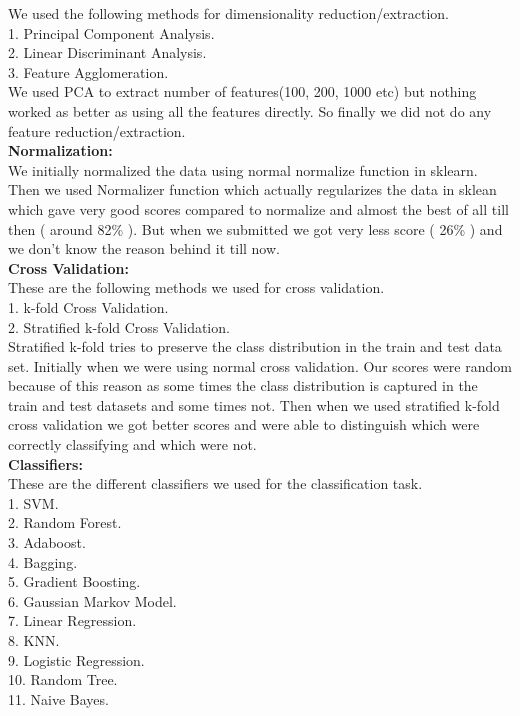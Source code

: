 \documentclass{article}
\begin{document}
We used the following methods for dimensionality reduction/extraction.\\
1. Principal Component Analysis.\\
2. Linear Discriminant Analysis.\\
3. Feature Agglomeration.\\

We used PCA to extract number of features(100, 200, 1000 etc) but nothing worked as better as using all the features directly. So finally we did not do any feature reduction/extraction.\\

{\bf Normalization:}\\

We initially normalized the data using normal normalize function in sklearn. Then we used Normalizer function which actually regularizes the data in sklean which gave very good scores compared to normalize and almost the best of all till then ( around 82\% ). But when we submitted we got very less score ( 26\% ) and we don't know the reason behind it till now.\\

{\bf Cross Validation:}\\
These are the following methods we used for cross validation.\\

1. k-fold Cross Validation.\\
2. Stratified k-fold Cross Validation.\\

Stratified k-fold tries to preserve the class distribution in the train and test data set. Initially when we were using normal cross validation. Our scores were random because of this reason as some times the class distribution is captured in the train and test datasets and some times not. Then when we used stratified k-fold cross validation we got better scores and were able to distinguish which were correctly classifying and which were not.\\

{\bf Classifiers:}\\
These are the different classifiers we used for the classification task.\\

1. SVM.\\
2. Random Forest.\\
3. Adaboost.\\
4. Bagging.\\
5. Gradient Boosting.\\
6. Gaussian Markov Model.\\
7. Linear Regression.\\
8. KNN.\\
9. Logistic Regression.\\
10. Random Tree.\\
11. Naive Bayes.\\
\end{document}
